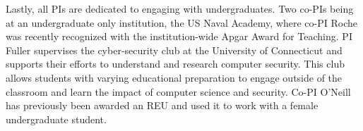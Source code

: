 Lastly, all PIs are
dedicated to engaging with undergraduates. Two co-PIs being at an
undergraduate only institution, the US Naval Academy, where co-PI Roche
was recently recognized with the institution-wide Apgar Award for
Teaching.  PI Fuller supervises the cyber-security club at the
University of Connecticut and supports their efforts to understand and
research computer security.  This club allows students with varying
educational preparation to engage outside of the classroom and learn the
impact of computer science and security.  Co-PI O'Neill has previously
been awarded an REU and used it to  work with a female undergraduate
student.



